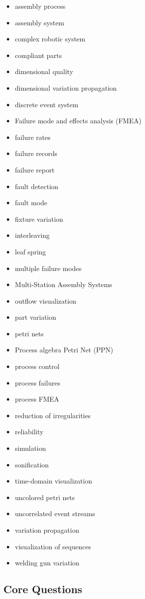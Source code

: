 \documentclass[a4paper,10pt]{article}
\begin{document}
\begin{itemize}
 \item assembly process
 \item assembly system
 \item complex robotic system
 \item compliant parts
 \item dimensional quality
 \item dimensional variation propagation
 \item discrete event system
 \item Failure mode and effects analysis (FMEA)
 \item failure rates
 \item failure records
 \item failure report
 \item fault detection
 \item fault mode
 \item fixture variation
 \item interleaving
 \item leaf spring
 \item multiple failure modes
 \item Multi-Station Assembly Systems
 \item outflow visualization
 \item part variation
 \item petri nets
 \item Process algebra Petri Net (PPN)
 \item process control
 \item process failures
 \item process FMEA
 \item reduction of irregularities
 \item reliability
 \item simulation
 \item sonification
 \item time-domain visualization
 \item uncolored petri nets
 \item uncorrelated event streams
 \item variation propagation
 \item visualization of sequences
 \item welding gun variation
\end{itemize}

\subsection{Core Questions}
\end{document}
